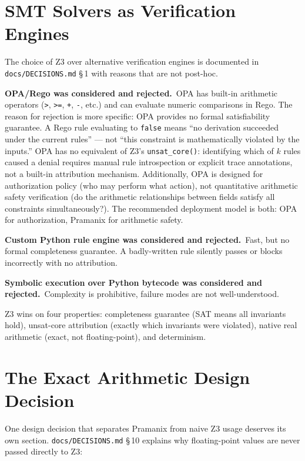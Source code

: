 \documentclass[12pt,a4paper,oneside]{report}
\newcommand{\fname}[1]{\texttt{#1}}          %
\newcommand{\code}[1]{\texttt{#1}}           %
\newcommand{\cfrsec}[1]{\S\,#1}             %
\begin{document}
\section{SMT Solvers as Verification Engines}

The choice of Z3 over alternative verification engines is documented in
\fname{docs/DECISIONS.md} \cfrsec{1} with reasons that are not post-hoc.

\textbf{OPA/Rego was considered and rejected.}\ OPA has built-in arithmetic
operators (\code{>}, \code{>=}, \code{+}, \code{-}, etc.) and can evaluate
numeric comparisons in Rego.  The reason for rejection is more specific:
OPA provides no formal satisfiability guarantee.  A Rego rule evaluating to
\code{false} means ``no derivation succeeded under the current rules'' ---
not ``this constraint is mathematically violated by the inputs.''  OPA has
no equivalent of Z3's \code{unsat\_core()}: identifying which of $k$ rules
caused a denial requires manual rule introspection or explicit trace
annotations, not a built-in attribution mechanism.  Additionally, OPA is
designed for authorization policy (who may perform what action), not
quantitative arithmetic safety verification (do the arithmetic relationships
between fields satisfy all constraints simultaneously?).  The recommended
deployment model is both: OPA for authorization, Pramanix for arithmetic
safety.

\textbf{Custom Python rule engine was considered and rejected.}\ Fast, but no
formal completeness guarantee. A badly-written rule silently passes or blocks
incorrectly with no attribution.

\textbf{Symbolic execution over Python bytecode was considered and rejected.}\
Complexity is prohibitive, failure modes are not well-understood.

Z3 wins on four properties: completeness guarantee (SAT means all invariants
hold), unsat-core attribution (exactly which invariants were violated), native
real arithmetic (exact, not floating-point), and determinism.

\section{The Exact Arithmetic Design Decision}

One design decision that separates Pramanix from naive Z3 usage deserves its
own section. \fname{docs/DECISIONS.md} \cfrsec{10} explains why floating-point
values are never passed directly to Z3:
\end{document}

